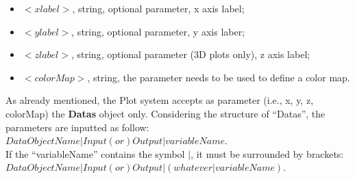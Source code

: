 \begin{itemize}
     \item \textit{$<xlabel>$}, string, optional parameter, x axis label;
     \item \textit{$<ylabel>$}, string, optional parameter, y axis laber;
     \item \textit{$<zlabel>$}, string, optional parameter (3D plots only), z axis label;
     \item \textit{$<colorMap>$}, string, the parameter needs to be used to define a color map.
\end{itemize}
As already mentioned, the Plot system accepts as parameter (i.e., x, y, z, colorMap) the \textbf{Datas} object only. Considering the structure of ``Datas'', the parameters are inputted as follow:
\\ $DataObjectName|Input(or)Output|variableName$.
\\ If the ``variableName'' contains the symbol $|$, it must be surrounded by brackets:
\\ $DataObjectName|Input(or)Output|(whatever|variableName)$.


